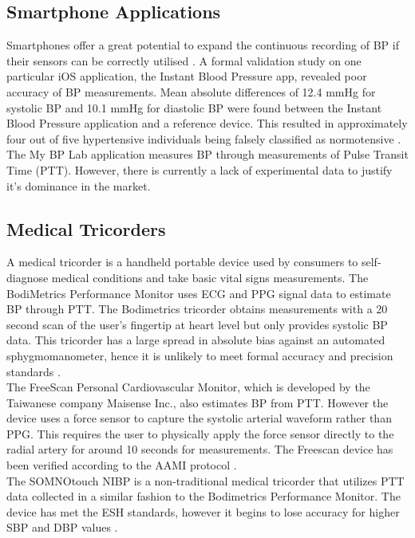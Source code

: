 \documentclass[11pt, a4paper]{article}
\begin{document}
\subsection{Smartphone Applications}
Smartphones offer a great potential to expand the continuous recording of BP if their sensors can be correctly utilised \cite{Bard2019}. A formal validation study on one particular iOS application, the Instant Blood Pressure app, revealed poor accuracy of BP measurements. Mean absolute differences of 12.4 mmHg for systolic BP and 10.1 mmHg for diastolic BP were found between the Instant Blood Pressure application and a reference device. This resulted in approximately four out of five hypertensive individuals being falsely classified as normotensive  \cite{Bard2019}. The My BP Lab application measures BP through measurements of Pulse Transit Time (PTT). However, there is currently a lack of experimental data to justify it's dominance in the market.

\subsection{Medical Tricorders}
A medical tricorder is a handheld portable device used by consumers to self-diagnose medical conditions and take basic vital signs measurements. The   BodiMetrics   Performance   Monitor uses ECG and PPG signal data to estimate BP through PTT. The Bodimetrics tricorder obtains measurements with a 20 second scan of the user’s fingertip at heart level but only provides systolic BP data. This tricorder has a large spread in absolute bias against an automated sphygmomanometer, hence it is unlikely to meet formal accuracy and precision standards \cite{Bard2019}. \\ \newline \noindent The FreeScan Personal Cardiovascular Monitor, which is developed by the Taiwanese company Maisense Inc., also estimates BP from PTT. However the device uses a force sensor to capture the systolic arterial waveform rather than PPG. This requires the user to physically apply the force sensor directly to the radial artery for around 10 seconds for measurements. The Freescan device has been verified according to the AAMI protocol \cite{Bard2019}. \\ \newline \noindent The SOMNOtouch NIBP is a non-traditional medical tricorder that utilizes PTT data collected in a similar fashion to the Bodimetrics Performance Monitor. The device has met the ESH standards, however it begins to lose accuracy for higher SBP and DBP values \cite{Bard2019}.
\end{document}
